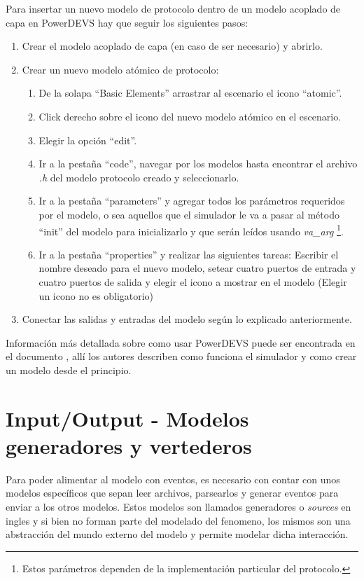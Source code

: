 \documentclass[10pt,a4paper]{article}
\begin{document}
Para insertar un nuevo modelo de protocolo dentro de un modelo acoplado de capa en PowerDEVS hay que seguir los siguientes pasos:

\begin{enumerate}
\item Crear el modelo acoplado de capa (en caso de ser necesario) y abrirlo.
\item Crear un nuevo modelo atómico de protocolo:
\begin{enumerate}
\item De la solapa ``Basic Elements'' arrastrar al escenario el icono ``atomic''.
\item Click derecho sobre el icono del nuevo modelo atómico en el escenario.
\item Elegir la opción  ``edit''.
\item Ir a la pestaña ``code'', navegar por los modelos hasta encontrar el archivo \textit{.h} del modelo protocolo creado y seleccionarlo.
\item Ir a la pestaña ``parameters'' y agregar todos los parámetros requeridos por el modelo, o sea aquellos que el simulador le va a pasar al método ``init'' del modelo para inicializarlo y que serán leídos usando \textit{va\_arg} \footnote{Estos parámetros dependen de la implementación particular del protocolo.}.
\item Ir a la pestaña ``properties'' y realizar las siguientes tareas: Escribir el nombre deseado para el nuevo modelo, setear cuatro puertos de entrada y cuatro puertos de salida y elegir el icono a mostrar en el modelo (Elegir un icono no es obligatorio)
\end{enumerate}
\item Conectar las salidas y entradas del modelo según lo explicado anteriormente.
\end{enumerate}

Información más detallada sobre como usar PowerDEVS puede ser encontrada en el documento \cite{bergero2011powerdevs}, allí los autores describen como funciona el simulador y como crear un modelo desde el principio. \\

\section{Input/Output - Modelos generadores y vertederos} \label{section: I/O}
Para poder alimentar al modelo con eventos, es necesario con contar con unos modelos específicos que sepan leer archivos, parsearlos y generar eventos para enviar a los otros modelos. Estos modelos son llamados generadores o \textit{sources} en ingles y si bien no forman parte del modelado del fenomeno, los mismos son una abstracción del mundo externo del modelo y permite modelar dicha interacción.
\end{document}
